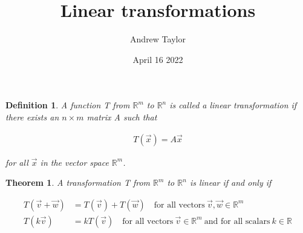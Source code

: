 \documentclass{article}
\title{Linear transformations}
\author{Andrew Taylor}
\date{April 16 2022}
\newtheorem{definition}{Definition}
\newtheorem{theorem}{Theorem}
\begin{document}
\maketitle

\begin{definition}
A function T from $\mathbb{R}^m$ to $\mathbb{R}^n$ is called a linear transformation if there exists an $n \times m$ matrix A such that

\begin{align*}
T(\vec{x}) = A\vec{x}
\end{align*}

for all $\vec{x}$ in the vector space $\mathbb{R}^m$.
\end{definition}

\begin{theorem}
A transformation T from $\mathbb{R}^m$ to $\mathbb{R}^n$ is linear if and only if

\begin{align*}
T(\vec{v} + \vec{w}) &= T(\vec{v}) + T(\vec{w}) \quad \textrm{for all vectors} \ \vec{v}, \vec{w} \in \mathbb{R}^m \\
T(k\vec{v}) &= kT(\vec{v})  \quad \textrm{for all vectors} \ \vec{v} \in \mathbb{R}^m \ \textrm{and for all scalars} \ k \in \mathbb{R}
\end{align*}

\end{theorem}
\end{document}
